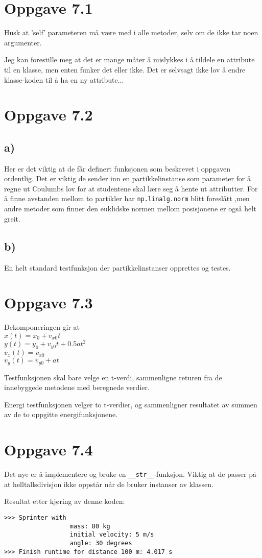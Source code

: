 \documentclass[10pt,a4paper]{article}
\begin{document}
\section*{Oppgave 7.1}
Husk at 'self' parameteren må være med i alle metoder, selv om de ikke tar noen argumenter.

Jeg kan forestille meg at det er mange måter å mislykkes i å tildele en attribute til en klasse, men enten funker det eller ikke. Det er selvsagt ikke lov å endre klasse-koden til å ha en ny attribute...



\newpage
\section*{Oppgave 7.2}
\subsection*{a)}
Her er det viktig at de får definert funksjonen som beskrevet i oppgaven ordentlig. Det er viktig de sender inn en partikkelinstanse som parameter for å regne ut Coulumbs lov for at studentene skal lære seg å hente ut attributter. For å finne avstanden mellom to partikler har \texttt{np.linalg.norm} blitt foreslått ,men andre metoder som finner den euklidske normen mellom posisjonene er også helt greit.
\subsection*{b)}
En helt standard testfunksjon der partikkelinstanser opprettes og testes. 


\newpage
\section*{Oppgave 7.3}
Dekomponeringen gir at\\
$x(t) = x_0 + v_{x0}t$\\
$y(t) = y_0 + v_{y0}t + 0.5at^2$\\
$v_x(t) = v_{x0}$\\
$v_y(t) = v_{y0} + at$

Testfunksjonen skal bare velge en t-verdi, sammenligne returen fra de innebyggede metodene med beregnede verdier.

Energi testfunksjonen velger to t-verdier, og sammenligner resultatet av summen av de to oppgitte energifunksjonene.



\newpage
\section*{Oppgave 7.4}
Det nye er å implementere og bruke en \texttt{\_\_str\_\_}-funksjon. Viktig at de passer på at helltallsdivisjon ikke oppstår når de bruker instanser av klassen.

Resultat etter kjøring av denne koden:
\begin{verbatim}
>>> Sprinter with 
			      mass: 80 kg 
			      initial velocity: 5 m/s
			      angle: 30 degrees
>>> Finish runtime for distance 100 m: 4.017 s
\end{verbatim}
\end{document}
